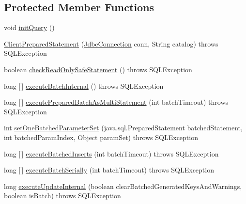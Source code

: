 \subsection*{Protected Member Functions}
\begin{DoxyCompactItemize}
\item 
void \mbox{\hyperlink{classcom_1_1mysql_1_1cj_1_1jdbc_1_1_client_prepared_statement_a3baa03c73cc707a13dd2c2a82cf523c0}{init\+Query}} ()
\item 
\mbox{\hyperlink{classcom_1_1mysql_1_1cj_1_1jdbc_1_1_client_prepared_statement_a7a030c8a939d2cd9798b9b6b1ccc52a1}{Client\+Prepared\+Statement}} (\mbox{\hyperlink{interfacecom_1_1mysql_1_1cj_1_1jdbc_1_1_jdbc_connection}{Jdbc\+Connection}} conn, String catalog)  throws S\+Q\+L\+Exception 
\item 
boolean \mbox{\hyperlink{classcom_1_1mysql_1_1cj_1_1jdbc_1_1_client_prepared_statement_a85e86eaeeabdd9406740be107b722ff5}{check\+Read\+Only\+Safe\+Statement}} ()  throws S\+Q\+L\+Exception 
\item 
long \mbox{[}$\,$\mbox{]} \mbox{\hyperlink{classcom_1_1mysql_1_1cj_1_1jdbc_1_1_client_prepared_statement_a6e350c039aa5b70044bc999f00ae9421}{execute\+Batch\+Internal}} ()  throws S\+Q\+L\+Exception 
\item 
long \mbox{[}$\,$\mbox{]} \mbox{\hyperlink{classcom_1_1mysql_1_1cj_1_1jdbc_1_1_client_prepared_statement_a3d883b0a5de64a49cbbb82c998fb9e5c}{execute\+Prepared\+Batch\+As\+Multi\+Statement}} (int batch\+Timeout)  throws S\+Q\+L\+Exception 
\item 
int \mbox{\hyperlink{classcom_1_1mysql_1_1cj_1_1jdbc_1_1_client_prepared_statement_a41d32216475bd0739bc83d19ec8c02fd}{set\+One\+Batched\+Parameter\+Set}} (java.\+sql.\+Prepared\+Statement batched\+Statement, int batched\+Param\+Index, Object param\+Set)  throws S\+Q\+L\+Exception 
\item 
long \mbox{[}$\,$\mbox{]} \mbox{\hyperlink{classcom_1_1mysql_1_1cj_1_1jdbc_1_1_client_prepared_statement_ad47127dbf61bdfd31b8e0230e8421616}{execute\+Batched\+Inserts}} (int batch\+Timeout)  throws S\+Q\+L\+Exception 
\item 
long \mbox{[}$\,$\mbox{]} \mbox{\hyperlink{classcom_1_1mysql_1_1cj_1_1jdbc_1_1_client_prepared_statement_a47a04fce09744ad87aa6889ef3193df7}{execute\+Batch\+Serially}} (int batch\+Timeout)  throws S\+Q\+L\+Exception 
\item 
long \mbox{\hyperlink{classcom_1_1mysql_1_1cj_1_1jdbc_1_1_client_prepared_statement_a6eec75c24c92ec36c85fc467e3f25512}{execute\+Update\+Internal}} (boolean clear\+Batched\+Generated\+Keys\+And\+Warnings, boolean is\+Batch)  throws S\+Q\+L\+Exception 

\end{DoxyCompactItemize}

